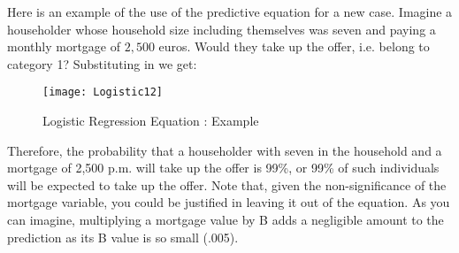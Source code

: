 \documentclass[a4paper,12pt]{article}
\begin{document}
Here is an example of the use of the predictive equation for a new case. Imagine a
householder whose household size including themselves was seven and paying
a monthly mortgage of $2,500$ euros. Would they take up the offer, i.e. belong to category 1?
Substituting in we get:
\begin{figure}
\begin{center}
  \texttt{[image: Logistic12]}\\
  \caption{Logistic Regression Equation : Example}
\end{center}
\end{figure}

Therefore, the probability that a householder with seven in the household and a mortgage of 2,500 p.m. will take up the offer is 99\%, or 99\% of such individuals will be
expected to take up the offer.
Note that, given the non-significance of the mortgage variable, you could be justified
in leaving it out of the equation. As you can imagine, multiplying a mortgage value by
B adds a negligible amount to the prediction as its B value is so small (.005).
\end{document}
